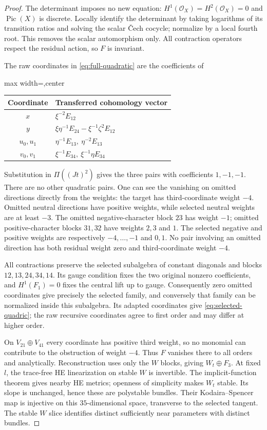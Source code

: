 \documentclass[11pt]{amsart}
\theoremstyle{definition}
\theoremstyle{remark}
\newcommand{\cO}{\mathcal O}
\begin{document}
\begin{proof}
The determinant imposes no new equation: $H^1(\cO_X)=H^2(\cO_X)=0$
and $\operatorname{Pic}(X)$ is discrete. Locally identify the determinant
by taking logarithms of its transition ratios and solving the scalar
\v Cech cocycle; normalize by a local fourth root. This removes the scalar
automorphism only. All contraction operators respect the residual action,
so $F$ is invariant.

The raw coordinates in \eqref{eq:full-quadratic} are the coefficients of
\begin{center}
\begin{adjustbox}{max width=\textwidth,center}
\begin{tabular}{cl}
\toprule
Coordinate & Transferred cohomology vector\\
\midrule
$x$ & $\xi^{-2}E_{12}$\\
$y$ & $\xi\eta^{-1}E_{24}-\xi^{-1}\zeta^2E_{12}$\\
$u_0,u_1$ & $\eta^{-1}E_{13},\ \eta^{-2}E_{13}$\\
$v_0,v_1$ & $\xi^{-1}E_{34},\ \xi^{-1}\eta E_{34}$\\
\bottomrule
\end{tabular}
\end{adjustbox}
\end{center}
Substitution in $\Pi((Jt)^2)$ gives the three pairs with coefficients
$1,-1,-1$. There are no other quadratic pairs. One can see the
vanishing on omitted directions directly from the weights: the target
has third-coordinate weight $-4$. Omitted neutral directions have
positive weights, while selected neutral weights are at least $-3$.
The omitted negative-character block $23$ has weight $-1$; omitted
positive-character blocks $31,32$ have weights $2,3$ and $1$.
The selected negative and positive weights are respectively $-4,\ldots,-1$
and $0,1$. No pair involving an omitted direction has both residual
weight zero and third-coordinate weight $-4$.

All contractions preserve the selected subalgebra of constant diagonals
and blocks $12,13,24,34,14$. Its gauge condition fixes the two original
nonzero coefficients, and $H^1(F_1)=0$ fixes the central lift up to gauge.
Consequently zero omitted coordinates give precisely the selected
family, and conversely that family can be normalized inside this
subalgebra. Its adapted coordinates give \eqref{eq:selected-quadric};
the raw recursive coordinates agree to first order and may differ at
higher order.

On $V_{21}\oplus V_{41}$ every coordinate has positive third weight,
so no monomial can contribute to the obstruction of weight $-4$.
Thus $F$ vanishes there to all orders and analytically. Reconstruction
uses only the $W$ blocks, giving $W_t\oplus F_3$.
At fixed $l$, the trace-free HE linearization on stable $W$ is invertible.
The implicit-function theorem gives nearby HE metrics; openness of
simplicity makes $W_t$ stable. Its slope is unchanged, hence these are
polystable bundles. Their Kodaira--Spencer map is injective on this
$35$-dimensional space, transverse to the selected tangent. The stable
$W$ slice identifies distinct sufficiently near parameters with distinct
bundles.


\end{proof}
\end{document}
